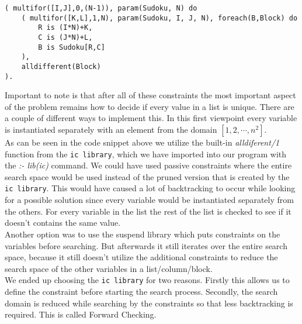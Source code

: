 \begin{lstlisting}
( multifor([I,J],0,(N-1)), param(Sudoku, N) do
	( multifor([K,L],1,N), param(Sudoku, I, J, N), foreach(B,Block) do
		R is (I*N)+K,
		C is (J*N)+L,
		B is Sudoku[R,C]
	),
	alldifferent(Block)
).
\end{lstlisting}

Important to note is that after all of these constraints the most important aspect of the problem remains how to decide if every value in a list is unique. 
There are a couple of different ways to implement this.
In this first viewpoint every variable is instantiated separately with an element from the domain $[1,2,\cdots,n^{2}]$. \\

As can be seen in the code snippet above we utilize the built-in \textsl{alldiferent/1} function from the \texttt{ic library}, which we have imported into our program with the \textsl{:- lib(ic)} command.
We could have used passive constraints where the entire search space would be used instead of the pruned version that is created by the \texttt{ic library}.
This would have caused a lot of backtracking to occur while looking for a possible solution since every variable would be instantiated separately from the others.
For every variable in the list the rest of the list is checked to see if it doesn't contains the same value.\\

Another option was to use the suspend library which puts constraints on the variables before searching.
But afterwards it still iterates over the entire search space, because it still doesn't utilize the additional constraints to reduce the search space of the other variables in a list/column/block.\\
\newpage
We ended up choosing the \texttt{ic library} for two reasons.
Firstly this allows us to define the constraint before starting the search process.
Secondly, the search domain is reduced while searching by the constraints so that less backtracking is required.
This is called Forward Checking. \\

